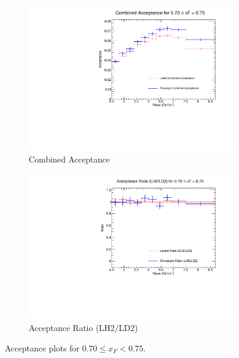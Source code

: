 \documentclass[11pt]{article}
\begin{document}
\begin{figure}[p]
\begin{subfigure}[b]{0.48\textwidth}
       \includegraphics[width=\linewidth]{./acceptancePlots/Combined_acceptance_xF_bin_14.pdf}
       \caption{Combined Acceptance}
    \end{subfigure}\hfill
    \begin{subfigure}[b]{0.48\textwidth}
       \includegraphics[width=\linewidth]{./acceptancePlots/Acceptance_ratio_xF_bin_14.pdf}
       \caption{Acceptance Ratio (LH2/LD2)}
    \end{subfigure}
    \caption{Acceptance plots for $0.70 \le x_F < 0.75$.}
\end{figure}
\end{document}
